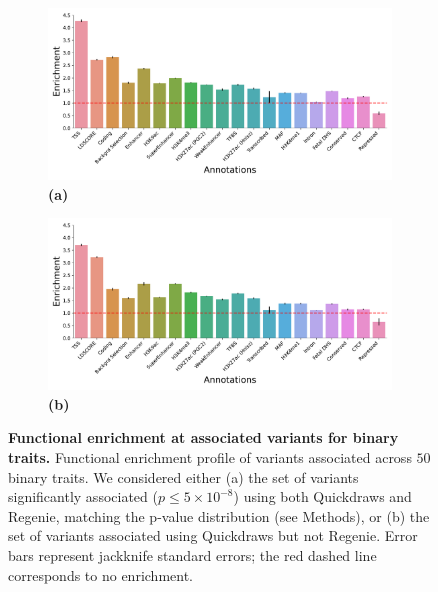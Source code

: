 \begin{figure}[h!]
    \centering
    \begin{subfigure}{0.5\textwidth}
    \captionsetup{justification=raggedright,singlelinecheck=false}
    \caption*{\textbf{(a)}}
    \includegraphics[width=\textwidth]{figures/functional/annotation_both_binary.pdf}
    \end{subfigure}%
    \begin{subfigure}{0.5\textwidth}
    \captionsetup{justification=raggedright,singlelinecheck=false}
    \caption*{\textbf{(b)}}
    \includegraphics[width=\textwidth]{figures/functional/annotation_onlyqd_binary.pdf}
    \end{subfigure}
    \caption{\textbf{Functional enrichment at associated variants for binary traits.}
    Functional enrichment profile of variants associated across $50$ binary traits.
    We considered either (a) the set of variants significantly associated ($p \leq 5 \times 10^{-8}$) using both Quickdraws and Regenie, matching the p-value distribution (see Methods), or (b) the set of variants associated using Quickdraws but not Regenie.
    Error bars represent jackknife standard errors; the red dashed line corresponds to no enrichment.
    }
    \label{fig:functional_bt}
\end{figure}

